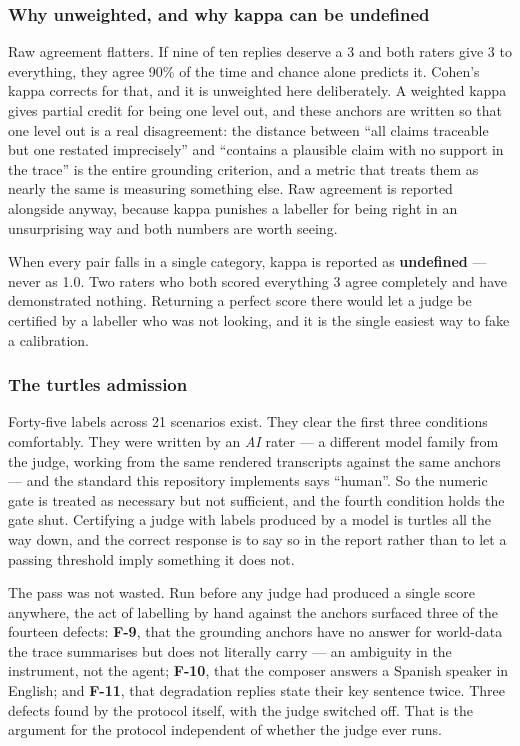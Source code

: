 \documentclass[11pt,a4paper]{article}
\newcommand{\finding}[1]{{\color{primaryblue}\textbf{#1}}}
\begin{document}
\subsubsection*{Why unweighted, and why kappa can be undefined}

Raw agreement flatters. If nine of ten replies deserve a 3 and both raters give 3 to everything, they agree 90\% of the time and chance alone predicts it. Cohen's kappa corrects for that, and it is unweighted here deliberately. A weighted kappa gives partial credit for being one level out, and these anchors are written so that one level out is a real disagreement: the distance between ``all claims traceable but one restated imprecisely'' and ``contains a plausible claim with no support in the trace'' is the entire grounding criterion, and a metric that treats them as nearly the same is measuring something else. Raw agreement is reported alongside anyway, because kappa punishes a labeller for being right in an unsurprising way and both numbers are worth seeing.

When every pair falls in a single category, kappa is reported as \textbf{undefined} --- never as 1.0. Two raters who both scored everything 3 agree completely and have demonstrated nothing. Returning a perfect score there would let a judge be certified by a labeller who was not looking, and it is the single easiest way to fake a calibration.

\subsubsection*{The turtles admission}

Forty-five labels across 21 scenarios exist. They clear the first three conditions comfortably. They were written by an \emph{AI} rater --- a different model family from the judge, working from the same rendered transcripts against the same anchors --- and the standard this repository implements says ``human''. So the numeric gate is treated as necessary but not sufficient, and the fourth condition holds the gate shut. Certifying a judge with labels produced by a model is turtles all the way down, and the correct response is to say so in the report rather than to let a passing threshold imply something it does not.

The pass was not wasted. Run before any judge had produced a single score anywhere, the act of labelling by hand against the anchors surfaced three of the fourteen defects: \finding{F-9}, that the grounding anchors have no answer for world-data the trace summarises but does not literally carry --- an ambiguity in the instrument, not the agent; \finding{F-10}, that the composer answers a Spanish speaker in English; and \finding{F-11}, that degradation replies state their key sentence twice. Three defects found by the protocol itself, with the judge switched off. That is the argument for the protocol independent of whether the judge ever runs.
\end{document}
